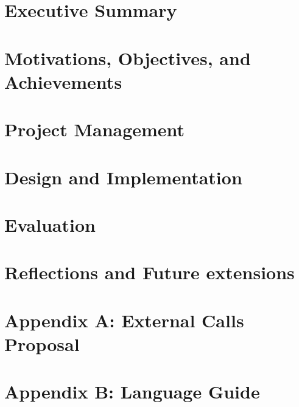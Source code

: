 \documentclass[12pt,twoside]{report}
\begin{document}


\clearpage{\pagestyle{empty}\cleardoublepage}
\setcounter{page}{1}
\pagestyle{fancy}

\tableofcontents
\clearpage{\pagestyle{empty}\cleardoublepage}
\setcounter{page}{1}
\fancyhead[LE,RO]{\slshape \rightmark}
\fancyhead[LO,RE]{\slshape \leftmark}

\chapter{Executive Summary}


\chapter{Motivations, Objectives, and Achievements}


\chapter{Project Management}


\chapter{Design and Implementation}






\chapter{Evaluation}


\chapter{Reflections and Future extensions}


\printbibliography[heading=bibintoc]


\chapter*{Appendix A: External Calls Proposal}
\label{chp:appendix-a}


\chapter*{Appendix B: Language Guide}
\label{chp:appendix-b}

\end{document}
